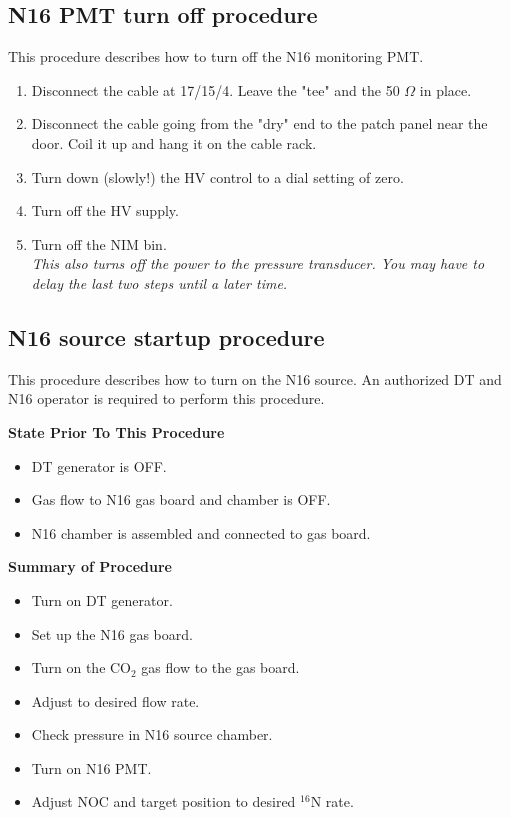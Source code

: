 \documentclass[10pt]{article}
\begin{document}
\subsection{ N16 PMT turn off procedure}

This procedure describes how to turn off the N16 monitoring PMT.
\begin{enumerate}
\item \CheckBox[name=n16pof1]{} Disconnect the cable at 17/15/4. Leave the "tee" and the 50 $\Omega$ in place.
\item \CheckBox[name=n16pof2]{} Disconnect the cable going from the "dry" end to the patch panel near the door. Coil it up and hang it on the cable rack.
\item \CheckBox[name=n16pof3]{} Turn down (slowly!) the HV control to a dial setting of zero.
\item \CheckBox[name=n16pof4]{} Turn off the HV supply.
\item \CheckBox[name=n16pof5]{} Turn off the NIM bin.\\ {\it This also turns off the power to the pressure transducer. You may have to delay the last two steps until a later time.}
\end{enumerate}

\pagebreak
\subsection{ N16 source startup procedure}

This procedure describes how to turn on the N16 source. An authorized DT and N16 operator is required to perform this procedure.

{\bf State Prior To This Procedure}
\begin{itemize}
\item \CheckBox[name=sspp1]{} DT generator is OFF.
\item \CheckBox[name=sspp2]{} Gas flow to N16 gas board and chamber is OFF.
\item \CheckBox[name=sspp3]{} N16 chamber is assembled and connected to gas board.
\end{itemize}

{\bf Summary of Procedure}
\begin{itemize}
\item \CheckBox[name=sopn161]{} Turn on DT generator.
\item \CheckBox[name=sopn162]{} Set up the N16 gas board.
\item \CheckBox[name=sopn163]{} Turn on the CO$_2$ gas flow to the gas board.
\item \CheckBox[name=sopn164]{} Adjust to desired flow rate.
\item \CheckBox[name=sopn165]{} Check pressure in N16 source chamber.
\item \CheckBox[name=sopn166]{} Turn on N16 PMT.
\item \CheckBox[name=sopn167]{} Adjust NOC and target position to desired $^{16}$N rate.
\end{itemize}
\end{document}
